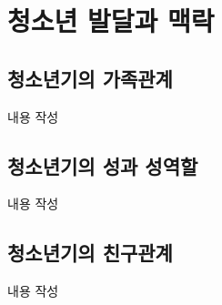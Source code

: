 \section{청소년 발달과 맥락}

\subsection{청소년기의 가족관계}
내용 작성

\subsection{청소년기의 성과 성역할}
내용 작성

\subsection{청소년기의 친구관계}
내용 작성
